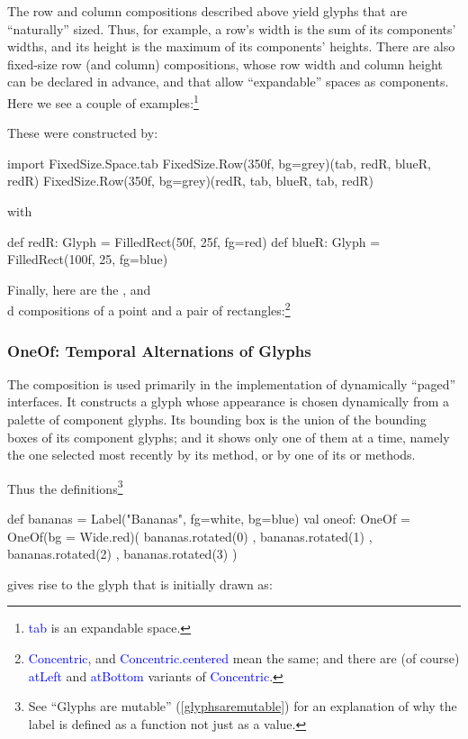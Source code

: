 \documentclass[12pt,a4paper]{article}
\def\Scala#1{\textcolor{blue}{\textsf{#1}}}
\def\SSS#1{\subsubsection*{#1}}
\begin{document}
The row and column compositions described above yield glyphs that
are ``naturally'' sized. Thus, for example, a row's width is the
sum of its components' widths, and its height is the maximum of its
components' heights. There are also fixed-size row (and column)
compositions, whose row width and column height can be declared in advance,
and that allow ``expandable'' spaces as components. Here we see a couple of examples:\footnote{\Scala{tab} is
an expandable space.}

\begin{center}
\quad\quad
{}
\end{center}

These were constructed by:
\begin{scala}
import FixedSize.Space.tab
FixedSize.Row(350f, bg=grey)(tab, redR, blueR, redR)
FixedSize.Row(350f, bg=grey)(redR, tab, blueR, tab, redR)
\end{scala}
with
\begin{scala}
def redR:  Glyph = FilledRect(50f, 25f, fg=red)
def blueR: Glyph = FilledRect(100f, 25, fg=blue)
\end{scala}

Finally, here are the ,
 and \\d{}
compositions of a point and a pair of rectangles:\footnote{\Scala{Concentric}, and
\Scala{Concentric.centered} mean the same;
and there are (of course) \Scala{atLeft} and \Scala{atBottom} variants
of \Scala{Concentric}.}


\begin{center}
\quad\quad
{}
\quad\quad
{} 
\end{center}


\SSS{OneOf: Temporal Alternations of Glyphs}
The  composition is used primarily in the implementation of
dynamically ``paged'' interfaces. It constructs a glyph whose appearance is chosen
dynamically from a palette of component glyphs.
Its bounding box is the union of the bounding boxes of its component glyphs;
and it shows only one of them at a time, namely the one selected most recently by  its  method,
or by one of its  or  methods.

Thus the definitions\footnote{See ``Glyphs are mutable'' (\ref {glyphsaremutable}) for an explanation
of why the label is defined as a function not just as a value.}
\begin{scala}
  def bananas = Label("Bananas", fg=white, bg=blue)
  val oneof: OneOf =
      OneOf(bg = Wide.red)( bananas.rotated(0)
                          , bananas.rotated(1)
                          , bananas.rotated(2)
                          , bananas.rotated(3)
                          )
 \end{scala}
gives rise to the glyph that is initially drawn as:
\begin{center}
\end{center}
\end{document}
